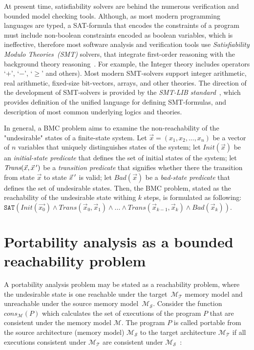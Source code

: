 At present time, satisfiability solvers are behind the numerous verification and bounded model checking tools.
Although, as most modern programming languages are typed, a SAT-formula that encodes the constraints of a program must include non-boolean constraints encoded as boolean variables, which is ineffective, therefore most software analysis and verification tools use \textit{Satisfiability Modulo Theories~(SMT)} solvers, that integrate first-order reasoning with the background theory reasoning~\cite{kroening2008decision}.
For example, the Integer theory includes operators `$+$', `$-$', `$\geqslant$' and others).
Most modern SMT-solvers support integer arithmetic, real arithmetic, fixed-size bit-vectors, arrays, and other theories.
The direction of the development of SMT-solvers is provided by the \textit{SMT-LIB standard}~\cite{smt-lib}, which provides definition of the unified language for defining SMT-formulas, and description of most common underlying logics and theories.

In general, a BMC problem aims to examine the non-reachability of the "undesirable" states of a finite-state system.
Let $\vec{x} = (x_1, x_2, ..., x_n)$ be a vector of $n$ variables that uniquely distinguishes states of the system; let $\textit{Init}(\vec{x})$ be an \textit{initial-state predicate} that defines the set of initial states of the system; let $\textit{Trans}(\vec{x}, \vec{x}\,')$ be a \textit{transition predicate} that signifies whether there the transition from state $\vec{x}$ to state $\vec{x}\,'$ is valid; let $\textit{Bad}(\vec{x})$ be a \textit{bad-state predicate} that defines the set of undesirable states.
Then, the BMC problem, stated as the reachability of the undesirable state withing $k$ steps, is formulated as following:
$\texttt{SAT}( \textit{Init}(\vec{x_0}) \land \textit{Trans}(\vec{x}_0, \vec{x}_1) \land ... \land \textit{Trans}(\vec{x}_{k-1}, \vec{x}_k) \land \textit{Bad}(\vec{x}_k) )$.


\section{Portability analysis as a bounded reachability problem}
\label{ch:enc:bmc}

A portability analysis problem may be stated as a reachability problem, where the undesirable state is one reachable under the target~$\mathcal{M_T}$ memory model and unreachable under the source memory model~$\mathcal{M_S}$.
Consider the function $\textit{cons}_{\mathcal{M}}(P)$ which calculates the set of executions of the program $P$ that are consistent under the memory model $\mathcal{M}$.
The program $P$ is called portable from the source architecture (memory model) $\mathcal{M_S}$ to the target architecture $\mathcal{M_T}$ if all executions consistent under $\mathcal{M_T}$ are consistent under $\mathcal{M_S}$~\cite{Porthos17a}:

